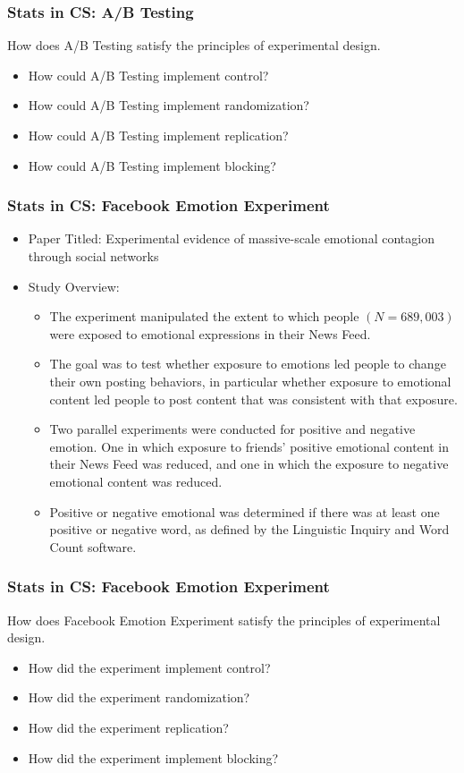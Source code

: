 \documentclass[mathserif]{beamer}
\begin{document}
\begin{frame}[t]
\frametitle{Stats in CS: A/B Testing}
How does A/B Testing satisfy the principles of experimental design.
	\begin{itemize}
		\item{How could A/B Testing implement control?}
		\item{How could A/B Testing implement randomization?}
		\item{How could A/B Testing implement replication?}
		\item{How could A/B Testing implement blocking?}
	\end{itemize}
\end{frame}

\begin{frame}[t]
\frametitle{Stats in CS: Facebook Emotion Experiment}
\begin{itemize}
	\item{Paper Titled: Experimental evidence of massive-scale emotional contagion through social networks}
	\item{Study Overview:}
	\begin{itemize}
		\item{The experiment manipulated the extent to which people $(N = 689,003)$ were exposed to emotional expressions in their News Feed. }
		\item{The goal was to test whether exposure to emotions led people to change their own posting behaviors, in particular whether exposure to emotional content led people to post content that was consistent with that exposure.}
		\item{Two parallel experiments were conducted for positive and negative emotion.  One in which exposure to friends' positive emotional content in their News Feed was reduced, and one in which the exposure to negative emotional content was reduced.}
		\item{Positive or negative emotional was determined if there was at least one positive or negative word, as defined by the Linguistic Inquiry and Word Count software.}
	\end{itemize}
\end{itemize}
\end{frame}

\begin{frame}[t]
\frametitle{Stats in CS: Facebook Emotion Experiment}
How does Facebook Emotion Experiment satisfy the principles of experimental design.
	\begin{itemize}
		\item{How did the experiment implement control?}
		\item{How did the experiment randomization?}
		\item{How did the experiment replication?}
		\item{How did the experiment implement blocking?}
	\end{itemize}
\end{frame}
\end{document}
